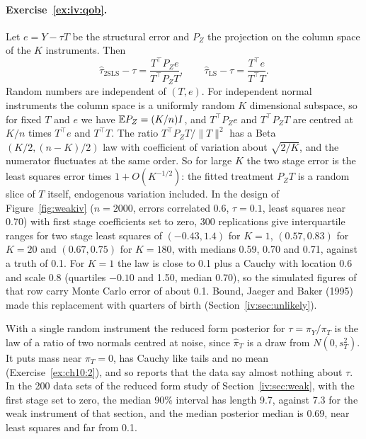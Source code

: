 \paragraph{Exercise~\ref{ex:iv:qob}.} Let $e = Y - \tau T$ be the structural error and $P_Z$ the projection on the column space of the $K$ instruments. Then
\[
\hat\tau_{\mathrm{2SLS}} - \tau = \frac{T^\top P_Z e}{T^\top P_Z T}, \qquad \hat\tau_{\mathrm{LS}} - \tau = \frac{T^\top e}{T^\top T}.
\]
Random numbers are independent of $(T, e)$. For independent normal instruments the column space is a uniformly random $K$ dimensional subspace, so for fixed $T$ and $e$ we have $\mathbb{E} P_Z = (K/n)I$, and $T^\top P_Z e$ and $T^\top P_Z T$ are centred at $K/n$ times $T^\top e$ and $T^\top T$. The ratio $T^\top P_Z T/\|T\|^2$ has a Beta$(K/2, (n - K)/2)$ law with coefficient of variation about $\sqrt{2/K}$, and the numerator fluctuates at the same order. So for large $K$ the two stage error is the least squares error times $1 + O(K^{-1/2})$: the fitted treatment $P_ZT$ is a random slice of $T$ itself, endogenous variation included. In the design of Figure~\ref{fig:weakiv} ($n = 2000$, errors correlated 0.6, $\tau = 0.1$, least squares near 0.70) with first stage coefficients set to zero, 300 replications give interquartile ranges for two stage least squares of $(-0.43, 1.4)$ for $K = 1$, $(0.57, 0.83)$ for $K = 20$ and $(0.67, 0.75)$ for $K = 180$, with medians 0.59, 0.70 and 0.71, against a truth of 0.1. For $K = 1$ the law is close to 0.1 plus a Cauchy with location 0.6 and scale 0.8 (quartiles $-0.10$ and 1.50, median 0.70), so the simulated figures of that row carry Monte Carlo error of about 0.1. Bound, Jaeger and Baker (1995) made this replacement with quarters of birth (Section~\ref{iv:sec:unlikely}).

With a single random instrument the reduced form posterior for $\tau = \pi_Y/\pi_T$ is the law of a ratio of two normals centred at noise, since $\hat\pi_T$ is a draw from $N(0, s_T^2)$. It puts mass near $\pi_T = 0$, has Cauchy like tails and no mean (Exercise~\ref{ex:ch10:2}), and so reports that the data say almost nothing about $\tau$. In the 200 data sets of the reduced form study of Section~\ref{iv:sec:weak}, with the first stage set to zero, the median 90\% interval has length 9.7, against 7.3 for the weak instrument of that section, and the median posterior median is 0.69, near least squares and far from 0.1.


